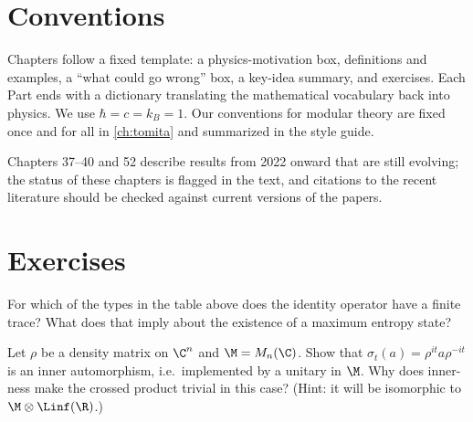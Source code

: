 \section{Conventions}

Chapters follow a fixed template: a physics-motivation box, definitions and examples, a ``what could go wrong'' box, a key-idea summary, and exercises. Each Part ends with a dictionary translating the mathematical vocabulary back into physics. We use $\hbar=c=k_B=1$. Our conventions for modular theory are fixed once and for all in \cref{ch:tomita} and summarized in the style guide.

\begin{unsettled}
Chapters 37--40 and 52 describe results from 2022 onward that are still evolving; the status of these chapters is flagged in the text, and citations to the recent literature should be checked against current versions of the papers.
\end{unsettled}

\section*{Exercises}
\begin{exercise}
For which of the types in the table above does the identity operator have a finite trace? What does that imply about the existence of a maximum entropy state?
\end{exercise}
\begin{exercise}
Let $\rho$ be a density matrix on $\C^n$ and $\M=M_n(\C)$. Show that $\sigma_t(a)=\rho^{it}a\rho^{-it}$ is an inner automorphism, i.e.\ implemented by a unitary in $\M$. Why does inner-ness make the crossed product trivial in this case? (Hint: it will be isomorphic to $\M\otimes\Linf(\R)$.)
\end{exercise}
